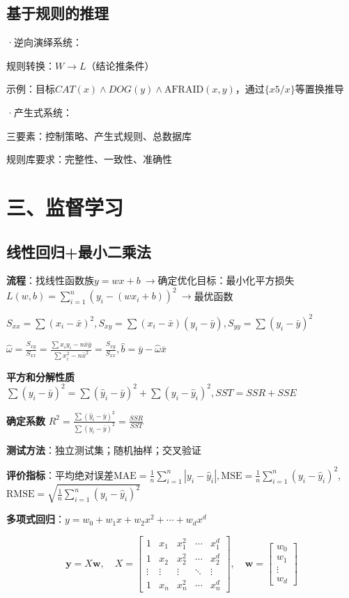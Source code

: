 	\subsection*{基于规则的推理}
	·逆向演绎系统：
	
	规则转换：$W\rightarrow L$（结论推条件）
	
	示例：目标$CAT(x)\wedge DOG(y)\wedge \text{AFRAID}(x,y)$，通过$\{x5/x\}$等置换推导
	
	·产生式系统：
	
	三要素：控制策略、产生式规则、总数据库
	
	规则库要求：完整性、一致性、准确性
	
	\section*{三、监督学习}
	
	\subsection*{线性回归+最小二乘法}
	
	\textbf{流程}：找线性函数族$y=wx+b~\rightarrow$确定优化目标：最小化平方损失$L(w,b)=\sum_{i=1}^{n}\left(y_{i}-\left(wx_{i}+b\right)\right)^{2}~\rightarrow$最优函数
	
	$\textstyle S_{xx} = \sum\left(x_{i} - \bar{x}\right)^{2}, 
	S_{xy} = \sum\left(x_{i} - \bar{x}\right)\left(y_{i} - \bar{y}\right), 
	S_{yy} = \sum\left(y_{i} - \bar{y}\right)^{2}$
	
	$\hat{\omega} = \frac{S_{xy}}{S_{xx}} 
	= \frac{\sum x_{i}y_{i} - n\bar{x}\bar{y}}{\sum x_{i}^{2} - n\bar{x}^{2}} 
	= \frac{S_{xy}}{S_{xx}}, \hat{b} = \bar{y} - \hat{\omega}\bar{x}$
	
	\textbf{平方和分解性质}$\sum (y_i - \bar{y})^2 = \sum (\hat{y}_i - \bar{y})^2 + \sum (y_i - \hat{y}_i)^2, SST=SSR+SSE$
	
	\textbf{确定系数} $R^2 = \frac{\sum (\hat{y}_i - \bar{y})^2}{\sum (y_i - \bar{y})^2} = \frac{SSR}{SST}$
	
	\textbf{测试方法}：独立测试集；随机抽样；交叉验证
	
	\textbf{评价指标}：$\text{平均绝对误差MAE} = \frac{1}{n} \sum_{i=1}^{n} |y_i - \hat{y}_i|, \text{MSE} = \frac{1}{n} \sum_{i=1}^{n} (y_i - \hat{y}_i)^2$, $\text{RMSE} = \sqrt{\frac{1}{n} \sum_{i=1}^{n} (y_i - \hat{y}_i)^2}$
	
	\textbf{多项式回归}：$y = w_0 + w_1 x + w_2 x^2 + \cdots + w_d x^d$
	
	$$
	\mathbf{y} = X\mathbf{w}, \quad
	X = \begin{bmatrix}
		1 & x_1 & x_1^2 & \cdots & x_1^d \\
		1 & x_2 & x_2^2 & \cdots & x_2^d \\
		\vdots & \vdots & \vdots & \ddots & \vdots \\
		1 & x_n & x_n^2 & \cdots & x_n^d
	\end{bmatrix}, \quad
	\mathbf{w} = \begin{bmatrix}
		w_0 \\ w_1 \\ \vdots \\ w_d
	\end{bmatrix}
	$$
	
